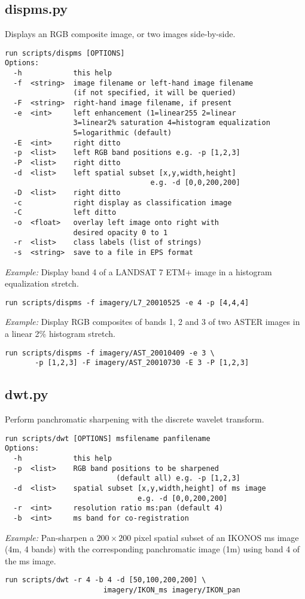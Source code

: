 \documentclass{paper}
\begin{document}
\subsection*{dispms.py}
Displays an RGB composite image, or two images side-by-side.
\begin{verbatim}
run scripts/dispms [OPTIONS]
Options:
  -h            this help
  -f  <string>  image filename or left-hand image filename
                (if not specified, it will be queried)
  -F  <string>  right-hand image filename, if present
  -e  <int>     left enhancement (1=linear255 2=linear
                3=linear2% saturation 4=histogram equalization
                5=logarithmic (default)
  -E  <int>     right ditto
  -p  <list>    left RGB band positions e.g. -p [1,2,3]
  -P  <list>    right ditto
  -d  <list>    left spatial subset [x,y,width,height]
                                  e.g. -d [0,0,200,200]
  -D  <list>    right ditto
  -c            right display as classification image
  -C            left ditto
  -o  <float>   overlay left image onto right with
                desired opacity 0 to 1
  -r  <list>    class labels (list of strings)
  -s  <string>  save to a file in EPS format
\end{verbatim}
{\it Example:} Display band 4 of a LANDSAT 7 ETM+ image in a histogram equalization stretch.
\begin{lstlisting}
run scripts/dispms -f imagery/L7_20010525 -e 4 -p [4,4,4]
\end{lstlisting}
{\it Example:} Display RGB composites of bands 1, 2 and 3 of two ASTER images in a linear 2\% histogram stretch.
\begin{lstlisting}
run scripts/dispms -f imagery/AST_20010409 -e 3 \
       -p [1,2,3] -F imagery/AST_20010730 -E 3 -P [1,2,3]
\end{lstlisting}





\subsection*{dwt.py}
Perform panchromatic sharpening with the discrete wavelet transform.
\begin{verbatim}
run scripts/dwt [OPTIONS] msfilename panfilename
Options:
  -h            this help
  -p  <list>    RGB band positions to be sharpened
                          (default all) e.g. -p [1,2,3]
  -d  <list>    spatial subset [x,y,width,height] of ms image
                               e.g. -d [0,0,200,200]
  -r  <int>     resolution ratio ms:pan (default 4)
  -b  <int>     ms band for co-registration
\end{verbatim}
{\it Example:} Pan-sharpen a $200\times 200$ pixel spatial subset of an IKONOS ms image (4m, 4 bands) with the corresponding panchromatic image (1m) using band 4 of the ms image.
\begin{lstlisting}
run scripts/dwt -r 4 -b 4 -d [50,100,200,200] \
                       imagery/IKON_ms imagery/IKON_pan
\end{lstlisting}
\end{document}
